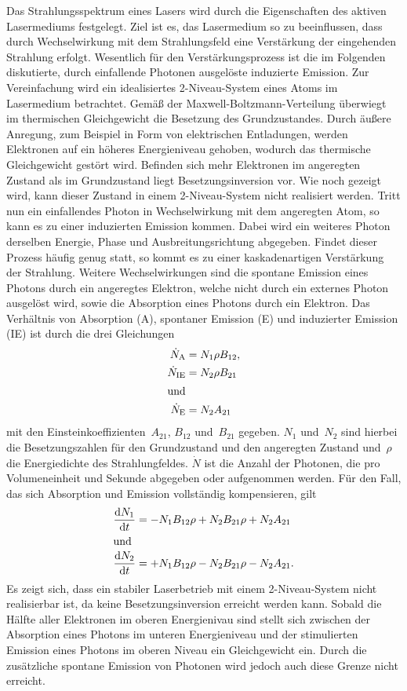 Das Strahlungsspektrum eines Lasers wird durch die Eigenschaften des aktiven
Lasermediums festgelegt. Ziel ist es, das Lasermedium so zu beeinflussen, dass
durch Wechselwirkung mit dem Strahlungsfeld eine Verstärkung der eingehenden
Strahlung erfolgt. Wesentlich für den Verstärkungsprozess ist die im Folgenden
diskutierte, durch einfallende Photonen ausgelöste induzierte Emission. Zur
Vereinfachung wird ein idealisiertes 2-Niveau-System eines Atoms im Lasermedium
betrachtet. Gemäß der Maxwell-Boltzmann-Verteilung überwiegt im thermischen
Gleichgewicht die Besetzung des Grundzustandes. Durch äußere Anregung, zum
Beispiel in Form von elektrischen Entladungen, werden Elektronen auf ein höheres
Energieniveau gehoben, wodurch das thermische Gleichgewicht gestört wird.
Befinden sich mehr Elektronen im angeregten Zustand als im Grundzustand liegt
Besetzungsinversion vor. Wie noch gezeigt wird, kann dieser Zustand in einem
2-Niveau-System nicht realisiert werden. Tritt nun ein einfallendes Photon in
Wechselwirkung mit dem angeregten Atom, so kann es zu einer induzierten Emission
kommen. Dabei wird ein weiteres Photon derselben Energie, Phase und
Ausbreitungsrichtung abgegeben. Findet dieser Prozess häufig genug statt, so
kommt es zu einer kaskadenartigen Verstärkung der Strahlung. Weitere
Wechselwirkungen sind die spontane Emission eines Photons durch ein angeregtes
Elektron, welche nicht durch ein externes Photon ausgelöst wird, sowie die
Absorption eines Photons durch ein Elektron. Das Verhältnis von Absorption (A),
spontaner Emission (E) und induzierter Emission (IE) ist durch die drei
Gleichungen
%
\begin{align}
  \dot{N}_{\mathrm{A}}&=N_1\rho B_{12}, \\
  \dot{N}_{\mathrm{IE}}&=N_2\rho B_{21} \\
  \shortintertext{und}
  \dot{N}_{\mathrm{E}}&=N_2A_{21}
\end{align}
%
mit den Einsteinkoeffizienten~$A_{21}$, $B_{12}$ und~$B_{21}$ gegeben. $N_1$
und~$N_2$ sind hierbei die Besetzungszahlen für den Grundzustand und den
angeregten Zustand und~$\rho$ die Energiedichte des Strahlungfeldes. $\dot{N}$
ist die Anzahl der Photonen, die pro Volumeneinheit und Sekunde abgegeben oder
aufgenommen werden. Für den Fall, das sich Absorption und Emission vollständig
kompensieren, gilt
%
\begin{align}
  \frac{\mathrm{d}N_1}{\mathrm{d}t}&=-N_1B_{12}\rho+N_2B_{21}\rho+N_2A_{21} \\
  \shortintertext{und}
  \frac{\mathrm{d}N_2}{\mathrm{d}t}&=+N_1B_{12}\rho-N_2B_{21}\rho-N_2A_{21}.
\end{align}
%
Es zeigt sich, dass ein stabiler Laserbetrieb mit einem 2-Niveau-System nicht
realisierbar ist, da keine Besetzungsinversion erreicht werden kann. Sobald die
Hälfte aller Elektronen im oberen Energienivau sind stellt sich zwischen der
Absorption eines Photons im unteren Energieniveau und der stimulierten Emission
eines Photons im oberen Niveau ein Gleichgewicht ein. Durch die zusätzliche
spontane Emission von Photonen wird jedoch auch diese Grenze nicht erreicht.

